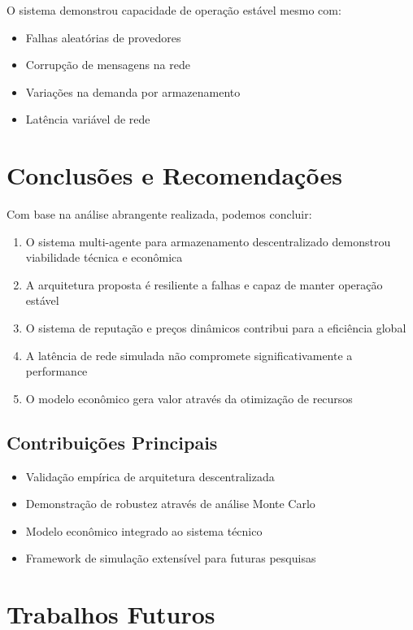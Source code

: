 \documentclass[12pt,a4paper]{article}
\begin{document}
O sistema demonstrou capacidade de operação estável mesmo com:
\begin{itemize}
    \item Falhas aleatórias de provedores
    \item Corrupção de mensagens na rede
    \item Variações na demanda por armazenamento
    \item Latência variável de rede
\end{itemize}


\section{Conclusões e Recomendações}


Com base na análise abrangente realizada, podemos concluir:

\begin{enumerate}
    \item O sistema multi-agente para armazenamento descentralizado demonstrou viabilidade técnica e econômica
    \item A arquitetura proposta é resiliente a falhas e capaz de manter operação estável
    \item O sistema de reputação e preços dinâmicos contribui para a eficiência global
    \item A latência de rede simulada não compromete significativamente a performance
    \item O modelo econômico gera valor através da otimização de recursos
\end{enumerate}

\subsection{Contribuições Principais}

\begin{itemize}
    \item Validação empírica de arquitetura descentralizada
    \item Demonstração de robustez através de análise Monte Carlo
    \item Modelo econômico integrado ao sistema técnico
    \item Framework de simulação extensível para futuras pesquisas
\end{itemize}


\section{Trabalhos Futuros}
\end{document}
